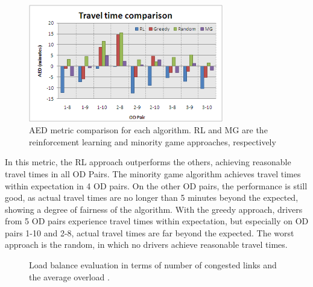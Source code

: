 \documentclass[12pt]{llncs}
\begin{document}
\begin{figure}[ht]
    \centerline{\includegraphics[width=8.5cm]{img/travelTimeComparison.png}}
    \caption{AED metric comparison for each algorithm. RL and MG are the reinforcement learning and minority game approaches, respectively}
    \label{fig:travelTimeComparison}
\end{figure}

In this metric, the RL approach outperforms the others, achieving reasonable travel times in all OD Pairs. The minority game algorithm achieves travel times within expectation in 4 OD pairs. On the other OD pairs, the performance is still good, as actual travel times are no longer than 5 minutes beyond the expected, showing a degree of fairness of the algorithm. With the greedy approach, drivers from 5 OD pairs experience travel times within expectation, but especially on OD pairs 1-10 and 2-8, actual travel times are far beyond the expected. The worst approach is the random, in which no drivers achieve reasonable travel times.


\begin{figure}[ht]
  \centering
  \caption{Load balance evaluation in terms of number of congested links  and the average overload .}
  \label{fig:loadBalance}
\end{figure}
\end{document}
